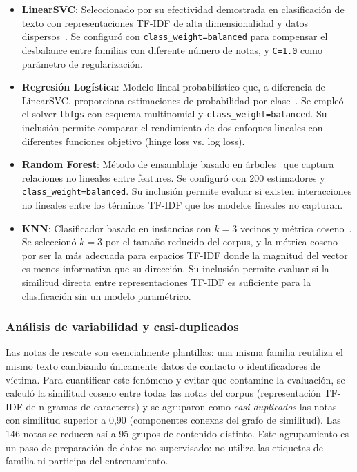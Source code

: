 \begin{itemize}
\item \textbf{LinearSVC}: Seleccionado por su efectividad demostrada en clasificación de texto con representaciones TF-IDF de alta dimensionalidad y datos dispersos~\cite{joachims1998}. Se configuró con \texttt{class\_weight=balanced} para compensar el desbalance entre familias con diferente número de notas, y \texttt{C=1.0} como parámetro de regularización.

\item \textbf{Regresión Logística}: Modelo lineal probabilístico que, a diferencia de LinearSVC, proporciona estimaciones de probabilidad por clase~\cite{hastie2009}. Se empleó el solver \texttt{lbfgs} con esquema multinomial y \texttt{class\_weight=balanced}. Su inclusión permite comparar el rendimiento de dos enfoques lineales con diferentes funciones objetivo (hinge loss vs. log loss).

\item \textbf{Random Forest}: Método de ensamblaje basado en árboles~\cite{breiman2001} que captura relaciones no lineales entre features. Se configuró con 200 estimadores y \texttt{class\_weight=balanced}. Su inclusión permite evaluar si existen interacciones no lineales entre los términos TF-IDF que los modelos lineales no capturan.

\item \textbf{KNN}: Clasificador basado en instancias con $k=3$ vecinos y métrica coseno~\cite{hastie2009}. Se seleccionó $k=3$ por el tamaño reducido del corpus, y la métrica coseno por ser la más adecuada para espacios TF-IDF donde la magnitud del vector es menos informativa que su dirección. Su inclusión permite evaluar si la similitud directa entre representaciones TF-IDF es suficiente para la clasificación sin un modelo paramétrico.
\end{itemize}

\subsubsection{Análisis de variabilidad y casi-duplicados}
\label{subsec:neardups}

Las notas de rescate son esencialmente plantillas: una misma familia reutiliza el mismo texto cambiando únicamente datos de contacto o identificadores de víctima. Para cuantificar este fenómeno y evitar que contamine la evaluación, se calculó la similitud coseno entre todas las notas del corpus (representación TF-IDF de n-gramas de caracteres) y se agruparon como \textit{casi-duplicados} las notas con similitud superior a 0,90 (componentes conexas del grafo de similitud). Las 146 notas se reducen así a 95 grupos de contenido distinto. Este agrupamiento es un paso de preparación de datos no supervisado: no utiliza las etiquetas de familia ni participa del entrenamiento.

